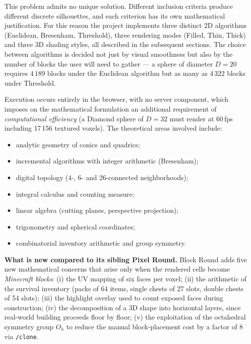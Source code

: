 \documentclass[12pt,a4paper]{scrartcl}
\newcommand{\cmd}[1]{\textcolor{earth}{\texttt{\small #1}}}
\begin{document}
This problem admits no unique solution. Different inclusion criteria produce different discrete silhouettes, and each criterion has its own mathematical justification. For this reason the project implements three distinct 2D algorithms (Euclidean, Bresenham, Threshold), three rendering modes (Filled, Thin, Thick) and three 3D shading styles, all described in the subsequent sections. The choice between algorithms is decided not just by visual smoothness but also by the number of blocks the user will need to gather --- a sphere of diameter $D=20$ requires $4\,189$ blocks under the Euclidean algorithm but as many as $4\,322$ blocks under Threshold.

Execution occurs entirely in the browser, with no server component, which imposes on the mathematical formulation an additional requirement of \emph{computational efficiency} (a Diamond sphere of $D=32$ must render at 60\,fps including 17\,156 textured voxels). The theoretical areas involved include:
\begin{itemize}[leftmargin=1.3em,itemsep=0.15em,topsep=0.3em]
  \item analytic geometry of conics and quadrics;
  \item incremental algorithms with integer arithmetic (Bresenham);
  \item digital topology (4-, 6- and 26-connected neighborhoods);
  \item integral calculus and counting measure;
  \item linear algebra (cutting planes, perspective projection);
  \item trigonometry and spherical coordinates;
  \item combinatorial inventory arithmetic and group symmetry.
\end{itemize}

\textbf{What is new compared to its sibling Pixel Round.} Block Round adds five new mathematical concerns that arise only when the rendered cells become \emph{Minecraft blocks}: (i) the UV mapping of six faces per voxel; (ii) the arithmetic of the survival inventory (packs of 64 items, single chests of 27 slots, double chests of 54 slots); (iii) the highlight overlay used to count exposed faces during construction; (iv) the decomposition of a 3D shape into horizontal layers, since real-world building proceeds floor by floor; (v) the exploitation of the octahedral symmetry group $O_h$ to reduce the manual block-placement cost by a factor of $8$ via \cmd{/clone}.

\end{document}
